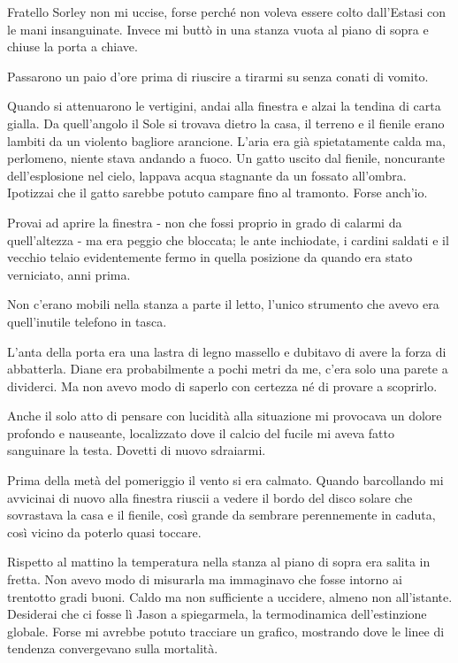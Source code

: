 \separatorefiori

Fratello Sorley non mi uccise, forse perché non voleva essere colto
dall'Estasi con le mani insanguinate. Invece mi buttò in una stanza
vuota al piano di sopra e chiuse la porta a chiave.

Passarono un paio d'ore prima di riuscire a tirarmi su senza conati di
vomito.

Quando si attenuarono le vertigini, andai alla finestra e alzai la
tendina di carta gialla. Da quell'angolo il Sole si trovava dietro la
casa, il terreno e il fienile erano lambiti da un violento bagliore
arancione. L'aria era già spietatamente calda ma, perlomeno, niente
stava andando a fuoco. Un gatto uscito dal fienile, noncurante
dell'esplosione nel cielo, lappava acqua stagnante da un fossato
all'ombra. Ipotizzai che il gatto sarebbe potuto campare fino al
tramonto. Forse anch'io.

Provai ad aprire la finestra - non che fossi proprio in grado di calarmi
da quell'altezza - ma era peggio che bloccata; le ante inchiodate, i
cardini saldati e il vecchio telaio evidentemente fermo in quella
posizione da quando era stato verniciato, anni prima.

Non c'erano mobili nella stanza a parte il letto, l'unico strumento che
avevo era quell'inutile telefono in tasca.

L'anta della porta era una lastra di legno massello e dubitavo di avere
la forza di abbatterla. Diane era probabilmente a pochi metri da me,
c'era solo una parete a dividerci. Ma non avevo modo di saperlo con
certezza né di provare a scoprirlo.

Anche il solo atto di pensare con lucidità alla situazione mi provocava
un dolore profondo e nauseante, localizzato dove il calcio del fucile mi
aveva fatto sanguinare la testa. Dovetti di nuovo sdraiarmi.

\separatorefiori

Prima della metà del pomeriggio il vento si era calmato. Quando
barcollando mi avvicinai di nuovo alla finestra riuscii a vedere il
bordo del disco solare che sovrastava la casa e il fienile, così grande
da sembrare perennemente in caduta, così vicino da poterlo quasi
toccare.

Rispetto al mattino la temperatura nella stanza al piano di sopra era
salita in fretta. Non avevo modo di misurarla ma immaginavo che fosse
intorno ai trentotto gradi buoni. Caldo ma non sufficiente a uccidere,
almeno non all'istante. Desiderai che ci fosse lì Jason a spiegarmela,
la termodinamica dell'estinzione globale. Forse mi avrebbe potuto
tracciare un grafico, mostrando dove le linee di tendenza convergevano
sulla mortalità.

